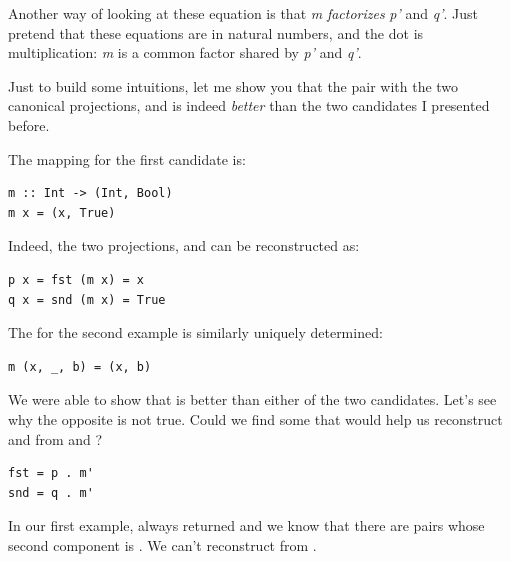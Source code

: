 \noindent
Another way of looking at these equation is that \emph{m}
\emph{factorizes} \emph{p'} and \emph{q'}. Just pretend that these
equations are in natural numbers, and the dot is multiplication:
\emph{m} is a common factor shared by \emph{p'} and \emph{q'}.

Just to build some intuitions, let me show you that the pair
 with the two canonical projections, 
and  is indeed \emph{better} than the two candidates I
presented before.

\begin{figure}[H]
  \centering
\end{figure}

\noindent
The mapping  for the first candidate is:

\begin{verbatim}
m :: Int -> (Int, Bool)
m x = (x, True)
\end{verbatim}

\noindent
Indeed, the two projections,  and  can be
reconstructed as:

\begin{verbatim}
p x = fst (m x) = x
q x = snd (m x) = True
\end{verbatim}

\noindent
The  for the second example is similarly uniquely determined:

\begin{verbatim}
m (x, _, b) = (x, b)
\end{verbatim}

\noindent
We were able to show that  is better than either of
the two candidates. Let's see why the opposite is not true. Could we
find some  that would help us reconstruct 
and  from  and ?

\begin{verbatim}
fst = p . m'
snd = q . m'
\end{verbatim}

In our first example,  always returned  and we
know that there are pairs whose second component is . We
can't reconstruct  from .

